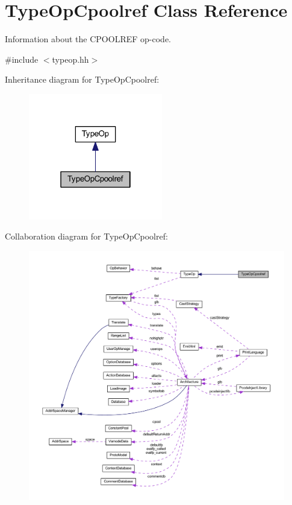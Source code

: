 \hypertarget{class_type_op_cpoolref}{}\section{Type\+Op\+Cpoolref Class Reference}
\label{class_type_op_cpoolref}


Information about the C\+P\+O\+O\+L\+R\+EF op-\/code.  




{\ttfamily \#include $<$typeop.\+hh$>$}



Inheritance diagram for Type\+Op\+Cpoolref\+:
\nopagebreak
\begin{figure}[H]
\begin{center}
\leavevmode
\includegraphics[width=166pt]{class_type_op_cpoolref__inherit__graph}
\end{center}
\end{figure}


Collaboration diagram for Type\+Op\+Cpoolref\+:
\nopagebreak
\begin{figure}[H]
\begin{center}
\leavevmode
\includegraphics[width=350pt]{class_type_op_cpoolref__coll__graph}
\end{center}
\end{figure}
